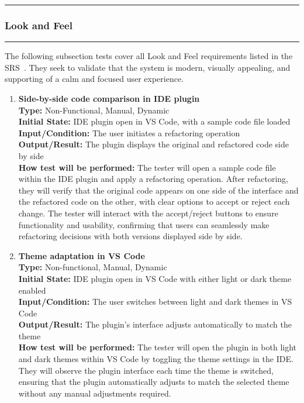 \documentclass[12pt, titlepage]{article}
\newcommand{\colorrule}{\textcolor{BlueViolet}{\rule{\linewidth}{2pt}}}
\begin{document}
\noindent
\colorrule

\subsubsection{Look and Feel}

\colorrule

\medskip

\noindent
The following subsection tests cover all Look and Feel requirements
listed in the SRS~\cite{SRS}. They seek to validate that the system
is modern, visually appealing, and supporting of a calm and focused
user experience.

\begin{enumerate}[label={\bf \textcolor{Maroon}{test-LF-\arabic*}},
    wide=0pt, font=\itshape]
  \item \textbf{Side-by-side code comparison in IDE plugin} \\[2mm]
    \textbf{Type:} Non-Functional, Manual, Dynamic \\
    \textbf{Initial State:} IDE plugin open in VS Code, with a sample
    code file loaded \\
    \textbf{Input/Condition:} The user initiates a refactoring operation \\
    \textbf{Output/Result:} The plugin displays the original and
    refactored code side by side\\[2mm]
    \textbf{How test will be performed:} The tester will open a
    sample code file within the IDE plugin and apply a refactoring
    operation. After refactoring, they will verify that the original
    code appears on one side of the interface and the refactored code
    on the other, with clear options to accept or reject each change.
    The tester will interact with the accept/reject buttons to ensure
    functionality and usability, confirming that users can seamlessly
    make refactoring decisions with both versions displayed side by side.

  \item \textbf{Theme adaptation in VS Code} \\[2mm]
    \textbf{Type:} Non-functional, Manual, Dynamic \\
    \textbf{Initial State:} IDE plugin open in VS Code with either
    light or dark theme enabled \\
    \textbf{Input/Condition:} The user switches between light and
    dark themes in VS Code \\
    \textbf{Output/Result:} The plugin’s interface adjusts
    automatically to match the theme \\[2mm]
    \textbf{How test will be performed:} The tester will open the
    plugin in both light and dark themes within VS Code by toggling
    the theme settings in the IDE. They will observe the plugin
    interface each time the theme is switched, ensuring that the
    plugin automatically adjusts to match the selected theme without
    any manual adjustments required.


\end{enumerate}
\end{document}
